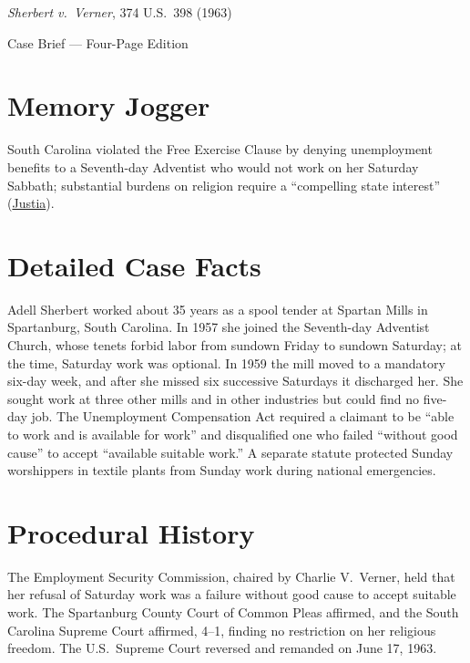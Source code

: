 \documentclass[12pt]{article}
\begin{document}
\begin{center}
{\LARGE \textit{Sherbert v.\ Verner}, 374 U.S.\ 398 (1963)\par}
\vspace{0.8em}
{\large Case Brief --- Four-Page Edition\par}
\end{center}
\vspace{1em}

\section{Memory Jogger}

South Carolina violated the Free Exercise Clause by denying unemployment benefits to a Seventh-day Adventist who would not work on her Saturday Sabbath; substantial burdens on religion require a ``compelling state interest'' (\href{https://supreme.justia.com/cases/federal/us/374/398/}{Justia}).

\section{Detailed Case Facts}

Adell Sherbert worked about 35 years as a spool tender at Spartan Mills in Spartanburg, South Carolina. In 1957 she joined the Seventh-day Adventist Church, whose tenets forbid labor from sundown Friday to sundown Saturday; at the time, Saturday work was optional. In 1959 the mill moved to a mandatory six-day week, and after she missed six successive Saturdays it discharged her. She sought work at three other mills and in other industries but could find no five-day job. The Unemployment Compensation Act required a claimant to be ``able to work and is available for work'' and disqualified one who failed ``without good cause'' to accept ``available suitable work.'' A separate statute protected Sunday worshippers in textile plants from Sunday work during national emergencies.

\section{Procedural History}

The Employment Security Commission, chaired by Charlie V.\ Verner, held that her refusal of Saturday work was a failure without good cause to accept suitable work. The Spartanburg County Court of Common Pleas affirmed, and the South Carolina Supreme Court affirmed, 4--1, finding no restriction on her religious freedom. The U.S.\ Supreme Court reversed and remanded on June 17, 1963.
\end{document}
